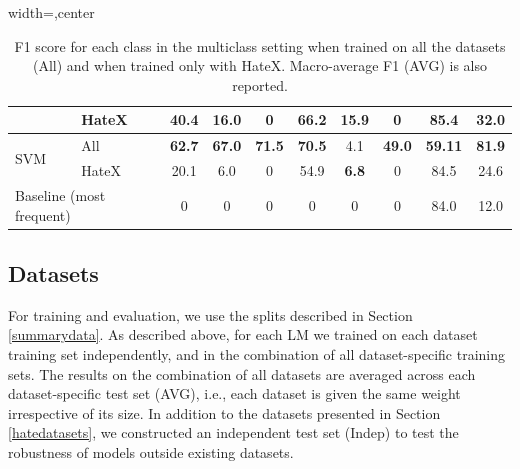 \begin{table}[ht]
\begin{adjustbox}{width=\textwidth,center}
\begin{tabular}{|l|l|c|c|c|c|c|c|c||c|}
                          & HateX     & 40.4           & 16.0           & 0                   & 66.2  & 15.9         & 0              & 85.4             & 32.0              \\ \hline
\multirow{2}{*}{SVM}     & All & \textbf{62.7} & \textbf{67.0} & \textbf{71.5} & \textbf{70.5} & 4.1 & \textbf{49.0} & \textbf{59.11} & \textbf{81.9} \\ \cline{2-10} 
                          & HateX  & 20.1 & 6.0 & 0 & 54.9 & \textbf{6.8} & 0 & 84.5 & 24.6 \\ \hline                          
\multicolumn{2}{|l|}{Baseline (most frequent)}                     & 0               & 0               & 0                   & 0            & 0                 & 0              & 84.0                & 12.0                 \\ \hline
\end{tabular}
\end{adjustbox}
\caption{F1 score for each class in the multiclass setting when trained on all the datasets (All) and when trained only with HateX. Macro-average F1 (AVG) is also reported.}
\label{tab:multiclass_results}
\end{table}
    
\subsection{Datasets}
\label{subsec:datasets}

For training and evaluation, we use the splits described in Section \ref{summarydata}. As described above, for each \ac{LM} we trained on each dataset training set independently, and in the combination of all dataset-specific training sets. The results on the combination of all datasets are averaged across each dataset-specific test set (AVG), i.e., each dataset is given the same weight irrespective of its size. In addition to the datasets presented in Section \ref{hatedatasets}, we constructed an independent test set (Indep) to test the robustness of models outside existing datasets.

